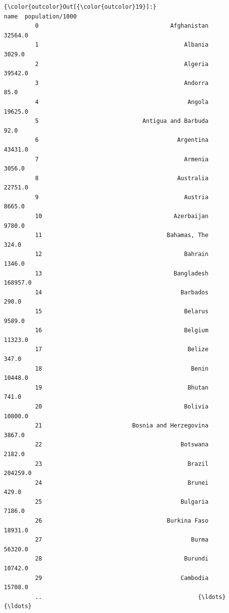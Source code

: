 \documentclass[11pt]{article}
\begin{document}
\begin{Verbatim}[commandchars=\\\{\}]
{\color{outcolor}Out[{\color{outcolor}19}]:}                                               name  population/1000
         0                                      Afghanistan          32564.0
         1                                          Albania           3029.0
         2                                          Algeria          39542.0
         3                                          Andorra             85.0
         4                                           Angola          19625.0
         5                              Antigua and Barbuda             92.0
         6                                        Argentina          43431.0
         7                                          Armenia           3056.0
         8                                        Australia          22751.0
         9                                          Austria           8665.0
         10                                      Azerbaijan           9780.0
         11                                    Bahamas, The            324.0
         12                                         Bahrain           1346.0
         13                                      Bangladesh         168957.0
         14                                        Barbados            290.0
         15                                         Belarus           9589.0
         16                                         Belgium          11323.0
         17                                          Belize            347.0
         18                                           Benin          10448.0
         19                                          Bhutan            741.0
         20                                         Bolivia          10800.0
         21                          Bosnia and Herzegovina           3867.0
         22                                        Botswana           2182.0
         23                                          Brazil         204259.0
         24                                          Brunei            429.0
         25                                        Bulgaria           7186.0
         26                                    Burkina Faso          18931.0
         27                                           Burma          56320.0
         28                                         Burundi          10742.0
         29                                        Cambodia          15708.0
         ..                                             {\ldots}              {\ldots}

\end{Verbatim}
\end{document}
